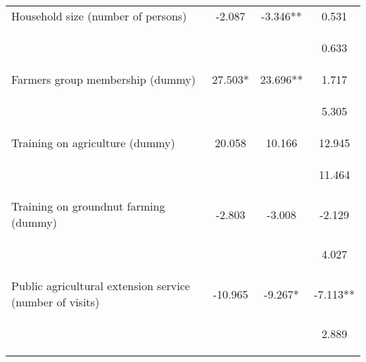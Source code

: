 \begin{center}
\begin{tabular}{lccc}
Household size (number of persons) & -2.087 & -3.346** & 0.531 \\
\vspace{4pt} & \begin{footnotesize}\end{footnotesize} & \begin{footnotesize}\end{footnotesize} & \begin{footnotesize}0.633\end{footnotesize} \\
Farmers group membership (dummy) & 27.503* & 23.696** & 1.717 \\
\vspace{4pt} & \begin{footnotesize}\end{footnotesize} & \begin{footnotesize}\end{footnotesize} & \begin{footnotesize}5.305\end{footnotesize} \\
Training on agriculture (dummy) & 20.058 & 10.166 & 12.945 \\
\vspace{4pt} & \begin{footnotesize}\end{footnotesize} & \begin{footnotesize}\end{footnotesize} & \begin{footnotesize}11.464\end{footnotesize} \\
Training on groundnut farming (dummy) & -2.803 & -3.008 & -2.129 \\
\vspace{4pt} & \begin{footnotesize}\end{footnotesize} & \begin{footnotesize}\end{footnotesize} & \begin{footnotesize}4.027\end{footnotesize} \\
Public agricultural extension service (number of visits) & -10.965 & -9.267* & -7.113** \\
\vspace{4pt} & \begin{footnotesize}\end{footnotesize} & \begin{footnotesize}\end{footnotesize} & \begin{footnotesize}2.889\end{footnotesize} \\

\end{tabular}
\end{center}
